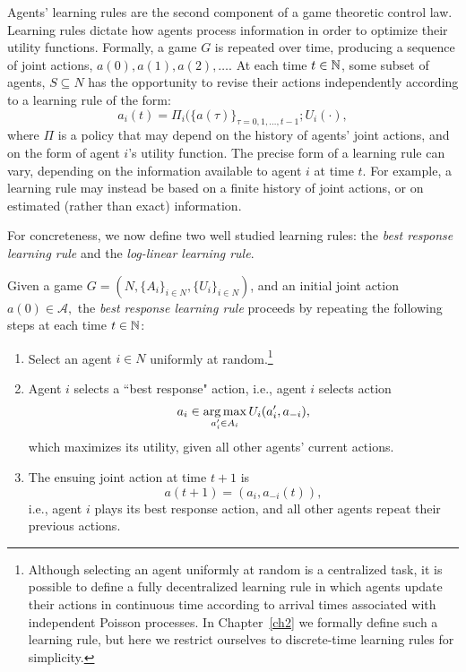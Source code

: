 Agents' learning rules are the second component of a game theoretic control law. Learning rules dictate how agents process information in order to optimize their utility functions. Formally, a game $G$ is repeated over time, producing a sequence of joint actions, $a(0), a(1),a(2),\ldots.$ At each time $t\in\mathbb{N}$, some subset of agents, $S\subseteq N$ has the opportunity to revise their actions independently according to a learning rule of the form:
$$a_i(t) = \Pi_i(\{a(\tau)\}_{\tau=0,1,\ldots,t-1};U_i(\cdot),$$
where $\Pi$ is a policy that may depend on the history of agents' joint actions, and on the form of agent $i$'s utility function. The precise form of a learning rule can vary, depending on the information available to agent $i$ at time $t$. For example, a learning rule may instead be based on a finite history of joint actions, or on estimated (rather than exact) information.

For concreteness, we now define two well studied learning rules: the {\it best response learning rule} and the {\it log-linear learning rule}.

\begin{defn}
Given a game $G = \left(N,\{A_i\}_{i\in N},\{U_i\}_{i\in N}\right)$, and an initial joint action $a(0)\in \mathcal{A},$ the {\it best response learning rule} proceeds by repeating the following steps at each time $t\in \mathbb{N}$:
\begin{enumerate}
    \item Select an agent $i\in N$ uniformly at random.\footnote{Although selecting an agent uniformly at random is a centralized task, it is possible to define a fully decentralized learning rule in which agents update their actions in continuous time according to arrival times associated with independent Poisson processes. In Chapter~\ref{ch2} we formally define such a learning rule, but here we restrict ourselves to discrete-time learning rules for simplicity.}
    \item Agent $i$ selects a ``best response" action, i.e., agent $i$ selects action
    $$a_i\in \operatorname*{arg\,max}_{a_i^\prime\in A_i}U_i(a_i^\prime,a_{-i}),$$
    which maximizes its utility, given all other agents' current actions.
    \item The ensuing joint action at time $t+1$ is 
    $$a(t+1) = (a_i,a_{-i}(t)),$$ i.e., agent $i$ plays its best response action, and all other agents repeat their previous actions.
\end{enumerate}
\end{defn}

